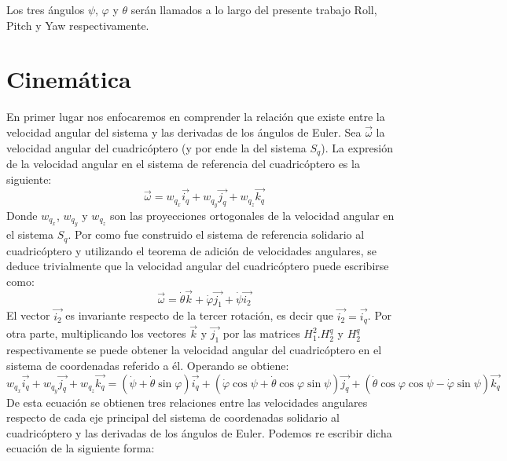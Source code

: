 \documentclass[main]{subfiles}
\begin{document}
Los tres \'angulos $\psi$, $\varphi$ y $\theta$ ser\'an llamados a lo largo del presente trabajo Roll, Pitch y Yaw respectivamente.

\section{Cinem\'atica}
En primer lugar nos enfocaremos en comprender la relaci\'on que existe entre la velocidad angular del sistema y las derivadas de los \'angulos de Euler. Sea $\vec{\omega}$ la velocidad angular del cuadric\'optero (y por ende la del sistema $S_q$). La expresi\'on de la velocidad angular en el sistema de referencia del cuadric\'optero es la siguiente:
\begin{equation}
\vec{\omega}=w_{q_x}\vec{i_q}+w_{q_y}\vec{j_q}+w_{q_z}\vec{k_q}
\end{equation}
Donde $w_{q_x}$, $w_{q_y}$ y $w_{q_z}$ son las proyecciones ortogonales de la velocidad angular en el sistema $S_q$.
Por como fue construido el sistema de referencia solidario al cuadric\'optero y utilizando el teorema de adici\'on de velocidades angulares, se deduce trivialmente que la velocidad angular del cuadric\'optero puede escribirse como:
\begin{equation}
\vec{\omega}=\dot{\theta}\vec{k}+\dot{\varphi}\vec{j_1}+\dot{\psi}\vec{i_2}
\end{equation}
El vector $\vec{i_2}$ es invariante respecto de la tercer rotaci\'on, es decir que $\vec{i_2}=\vec{i_q}$. Por otra parte, multiplicando los vectores $\vec{k}$ y $\vec{j_1}$ por las matrices $H_1^2.H_2^q$ y $H_2^q$ respectivamente se puede obtener la velocidad angular del cuadric\'optero en el sistema de coordenadas referido a \'el. Operando se obtiene:
{\small \begin{equation}
w_{q_x}\vec{i_q}+w_{q_y}\vec{j_q}+w_{q_z}\vec{k_q}= (\dot{\psi}  +    \dot{\theta}\sin\varphi)\vec{i_q}+(\dot{\varphi}\cos\psi + \dot{\theta}\cos\varphi \sin\psi)\vec{j_q}+(\dot{\theta}\cos\varphi \cos\psi -  \dot{\varphi}\sin\psi)\vec{k_q}
\end{equation}}
De esta ecuaci\'on se obtienen tres relaciones entre las velocidades angulares respecto de cada eje principal del sistema de coordenadas solidario al  cuadric\'optero y las derivadas de los \'angulos de Euler. Podemos re escribir dicha ecuaci\'on de la siguiente forma:
\end{document}
